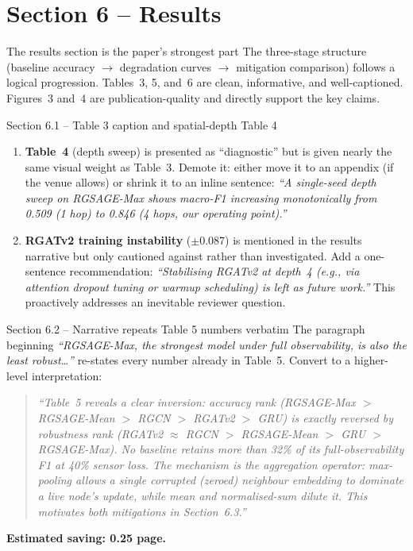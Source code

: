 \documentclass[11pt,a4paper]{article}
\begin{document}
\section{Section 6 -- Results}

\begin{okbox}{The results section is the paper's strongest part}
The three-stage structure (baseline accuracy $\to$ degradation curves $\to$
mitigation comparison) follows a logical progression. Tables~3, 5, and~6 are
clean, informative, and well-captioned. Figures~3 and~4 are publication-quality
and directly support the key claims.
\end{okbox}

\begin{warnbox}{Section 6.1 -- Table 3 caption and spatial-depth Table 4}
\begin{enumerate}[leftmargin=*,label=\arabic*.]
  \item \textbf{Table~4} (depth sweep) is presented as ``diagnostic'' but is
    given nearly the same visual weight as Table~3. Demote it: either move it
    to an appendix (if the venue allows) or shrink it to an inline sentence:
    \textit{``A single-seed depth sweep on RGSAGE-Max shows macro-F1
    increasing monotonically from 0.509 (1 hop) to 0.846 (4 hops, our
    operating point).''}
  \item \textbf{RGATv2 training instability} ($\pm$0.087) is mentioned in
    the results narrative but only cautioned against rather than
    investigated. Add a one-sentence recommendation: \textit{``Stabilising
    RGATv2 at depth~4 (e.g., via attention dropout tuning or warmup
    scheduling) is left as future work.''} This proactively addresses an
    inevitable reviewer question.
\end{enumerate}
\end{warnbox}

\begin{warnbox}{Section 6.2 -- Narrative repeats Table 5 numbers verbatim}
The paragraph beginning \textit{``RGSAGE-Max, the strongest model under full
observability, is also the least robust\ldots''} re-states every number already
in Table~5. Convert to a higher-level interpretation:
\begin{quote}
\textit{``Table~5 reveals a clear inversion: accuracy rank (RGSAGE-Max $>$
RGSAGE-Mean $>$ RGCN $>$ RGATv2 $>$ GRU) is exactly reversed by robustness
rank (RGATv2 $\approx$ RGCN $>$ RGSAGE-Mean $>$ GRU $>$ RGSAGE-Max). No
baseline retains more than 32\% of its full-observability F1 at 40\% sensor
loss. The mechanism is the aggregation operator: max-pooling allows a single
corrupted (zeroed) neighbour embedding to dominate a live node's update,
while mean and normalised-sum dilute it. This motivates both mitigations
in Section~6.3.''}
\end{quote}
\textbf{Estimated saving: 0.25 page.}
\end{warnbox}
\end{document}
